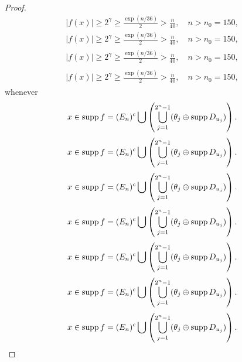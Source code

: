 \documentclass{amsart}
\numberwithin{equation}{section}
\begin{document}
\begin{proof}
{\begin{multline*}
|f(x)|\ge 2^\gamma\ge \frac{\exp(n/36)}{2}>\frac{n}{40},\quad n>n_0=150,
\end{multline*}\fi  
{}\begin{multline}
|f(x)|\ge 2^\gamma\ge \frac{\exp(n/36)}{2}>\frac{n}{40},\quad n>n_0=150,
\end{multline}\fi  
{}\begin{multline*}\begin{split}
|f(x)|\ge 2^\gamma\ge \frac{\exp(n/36)}{2}>\frac{n}{40},\quad n>n_0=150,
\end{split}\end{multline*}\fi
{}\begin{multline}\begin{split}
|f(x)|\ge 2^\gamma\ge \frac{\exp(n/36)}{2}>\frac{n}{40},\quad n>n_0=150,
\end{split}\end{multline}\fi
}
whenever
{
\begin{equation*} \label{a31}
x\in {{\rm supp\,}} f=(E_n)^c\bigcup\left(\bigcup_{j=1}^{2^n-1}(\theta_j\oplus {{\rm supp\,}} D_{u_j})\right).
 \end{equation*}\fi  
{}\begin{equation}\label{a31}
x\in {{\rm supp\,}} f=(E_n)^c\bigcup\left(\bigcup_{j=1}^{2^n-1}(\theta_j\oplus {{\rm supp\,}} D_{u_j})\right).
\end{equation}\fi   
{}\begin{align*}\label{a31}
x\in {{\rm supp\,}} f=(E_n)^c\bigcup\left(\bigcup_{j=1}^{2^n-1}(\theta_j\oplus {{\rm supp\,}} D_{u_j})\right).
\end{align*}\fi   
{}\begin{align}\label{a31}
x\in {{\rm supp\,}} f=(E_n)^c\bigcup\left(\bigcup_{j=1}^{2^n-1}(\theta_j\oplus {{\rm supp\,}} D_{u_j})\right).
\end{align}\fi    
{}\begin{gather*}\label{a31}
x\in {{\rm supp\,}} f=(E_n)^c\bigcup\left(\bigcup_{j=1}^{2^n-1}(\theta_j\oplus {{\rm supp\,}} D_{u_j})\right).
\end{gather*}\fi  
{}\begin{gather}\label{a31}
x\in {{\rm supp\,}} f=(E_n)^c\bigcup\left(\bigcup_{j=1}^{2^n-1}(\theta_j\oplus {{\rm supp\,}} D_{u_j})\right).
\end{gather}\fi   
{}\begin{multline*}\label{a31}
x\in {{\rm supp\,}} f=(E_n)^c\bigcup\left(\bigcup_{j=1}^{2^n-1}(\theta_j\oplus {{\rm supp\,}} D_{u_j})\right).
\end{multline*}\fi  
}
\end{proof}
\end{document}
